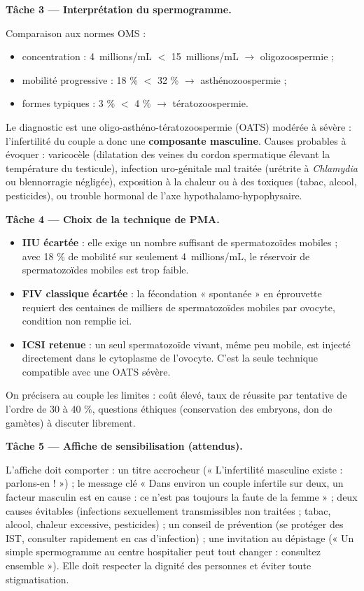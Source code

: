 \documentclass[11pt]{article}
\newcommand{\cle}[1]{{\popxbold\color{popdark}#1}}
\begin{document}
\begin{exoresolu}
\textbf{Tâche 3 — Interprétation du spermogramme.}

Comparaison aux normes OMS :
\begin{itemize}
\item concentration : \SI{4}{millions/mL} $<$ \SI{15}{millions/mL} $\rightarrow$ \cle{oligozoospermie} ;
\item mobilité progressive : 18 \% $<$ 32 \% $\rightarrow$ \cle{asthénozoospermie} ;
\item formes typiques : 3 \% $<$ 4 \% $\rightarrow$ \cle{tératozoospermie}.
\end{itemize}
Le diagnostic est une \cle{oligo-asthéno-tératozoospermie} (OATS) modérée à sévère : l'infertilité du couple a donc une \textbf{composante masculine}. Causes probables à évoquer : varicocèle (dilatation des veines du cordon spermatique élevant la température du testicule), infection uro-génitale mal traitée (urétrite à \emph{Chlamydia} ou blennorragie négligée), exposition à la chaleur ou à des toxiques (tabac, alcool, pesticides), ou trouble hormonal de l'axe hypothalamo-hypophysaire.

\textbf{Tâche 4 — Choix de la technique de PMA.}

\begin{itemize}
\item \textbf{IIU écartée} : elle exige un nombre suffisant de spermatozoïdes mobiles ; avec 18 \% de mobilité sur seulement \SI{4}{millions/mL}, le réservoir de spermatozoïdes mobiles est trop faible.
\item \textbf{FIV classique écartée} : la fécondation « spontanée » en éprouvette requiert des centaines de milliers de spermatozoïdes mobiles par ovocyte, condition non remplie ici.
\item \textbf{ICSI retenue} : un seul spermatozoïde vivant, même peu mobile, est injecté directement dans le cytoplasme de l'ovocyte. C'est la seule technique compatible avec une OATS sévère.
\end{itemize}
On précisera au couple les limites : coût élevé, taux de réussite par tentative de l'ordre de 30 à 40 \%, questions éthiques (conservation des embryons, don de gamètes) à discuter librement.

\textbf{Tâche 5 — Affiche de sensibilisation (attendus).}

L'affiche doit comporter : un titre accrocheur (« L'infertilité masculine existe : parlons-en ! ») ; le message clé « Dans environ un couple infertile sur deux, un facteur masculin est en cause : ce n'est pas toujours la faute de la femme » ; deux causes évitables (infections sexuellement transmissibles non traitées ; tabac, alcool, chaleur excessive, pesticides) ; un conseil de prévention (se protéger des IST, consulter rapidement en cas d'infection) ; une invitation au dépistage (« Un simple spermogramme au centre hospitalier peut tout changer : consultez ensemble »). Elle doit respecter la dignité des personnes et éviter toute stigmatisation.
\end{exoresolu}
\end{document}
